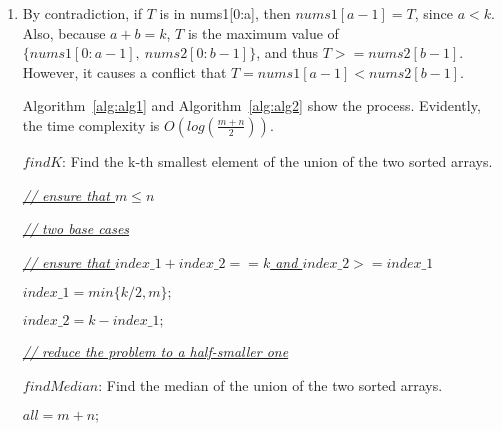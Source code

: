 \documentclass[12pt,a4paper]{article}
\makeatletter
\newtheorem*{solution}{Solution}
\renewenvironment{solution}[1][Solution] {\par\pushQED{\qed}\normalfont\topsep6\p@\@plus6\p@\relax\trivlist\item[\hskip\labelsep\bfseries#1\@addpunct{.}]\ignorespaces}{\popQED\endtrivlist\@endpefalse} \makeatother
\makeatother
\begin{document}
\begin{enumerate}
\begin{solution}
By contradiction, if $T$ is in nums1[0:a], then $nums1[a-1]=T$, since $a < k$. Also, because $a+b=k$, $T$ is the maximum value of $\{nums1[0:a-1],~nums2[0:b-1]\}$, and thus \emph{\underline{$T>=nums2[b-1]$}}. However, it causes a conflict that \emph{\underline{$T = nums1[a-1] < nums2[b-1]$}}.


Algorithm~\ref{alg:alg1}  and Algorithm~\ref{alg:alg2} show the process. Evidently, the time complexity is $O(log(\frac{m+n}{2}))$.



\begin{algorithm} 
  \label{alg:alg1}
  \caption{$findK$: Find the k-th smallest element of the union of the two sorted arrays.} 


  \underline{\emph{// ensure that $m \le n$ }}



  \underline{\emph{// two base cases }}




  \underline{\emph{// ensure that $index\_1 + index\_2 == k$ and $index\_2 >= index\_1$}}


  $index\_1 = min\{k/2 , m\} ;$


  $index\_2 = k - index\_1 ;$  

  \underline{\emph{// reduce the problem to a half-smaller one }}



\end{algorithm}
\begin{algorithm} 
  \label{alg:alg2}
  \caption{$findMedian$: Find the median of the union of the two sorted arrays.} 

  $ all = m + n ;$
\end{algorithm}



\end{solution}
\end{enumerate}
\end{document}
